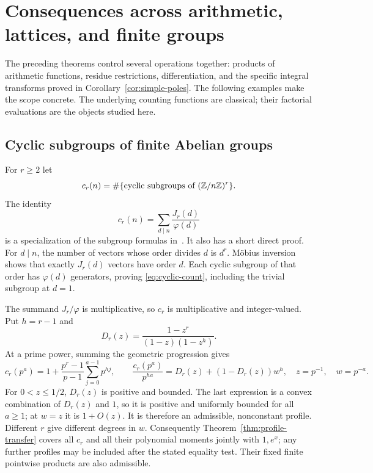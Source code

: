 \section{Consequences across arithmetic, lattices, and finite groups}
\label{sec:applications}

The preceding theorems control several operations together: products
of arithmetic functions, residue restrictions, differentiation, and
the specific integral transforms proved in
Corollary~\ref{cor:simple-poles}.  The following examples make the
scope concrete.  The underlying counting functions are classical;
their factorial evaluations are the objects studied here.

\subsection{Cyclic subgroups of finite Abelian groups}

For $r\geq2$ let
\[
 c_r(n)=\#\{\text{cyclic subgroups of }(\mathbb Z/n\mathbb Z)^r\}.
\]
The identity
\begin{equation}\label{eq:cyclic-count}
 c_r(n)=\sum_{d\mid n}\frac{J_r(d)}{\varphi(d)}
\end{equation}
is a specialization of the subgroup formulas in~\cite{Toth12}.
It also has a short direct proof.  For $d\mid n$, the number of
vectors whose order divides $d$ is $d^r$.  M\"obius inversion shows
that exactly $J_r(d)$ vectors have order $d$.  Each cyclic subgroup
of that order has $\varphi(d)$ generators, proving
\eqref{eq:cyclic-count}, including the trivial subgroup at $d=1$.

The summand $J_r/\varphi$ is multiplicative, so $c_r$ is
multiplicative and integer-valued.  Put $h=r-1$ and
\[
 D_r(z)=\frac{1-z^r}{(1-z)(1-z^h)}.
\]
At a prime power, summing the geometric progression gives
\[
 c_r(p^a)=1+\frac{p^r-1}{p-1}
                       \sum_{j=0}^{a-1}p^{hj},\qquad
 \frac{c_r(p^a)}{p^{ha}}
       =D_r(z)+(1-D_r(z))w^h,
 \quad z=p^{-1},\quad w=p^{-a}.
\]
For $0<z\leq1/2$, $D_r(z)$ is positive and bounded.  The last
expression is a convex combination of $D_r(z)$ and $1$, so it is
positive and uniformly bounded for all $a\geq1$; at $w=z$ it is
$1+O(z)$.  It is therefore an admissible, nonconstant profile.
Different $r$ give different degrees in $w$.  Consequently
Theorem~\ref{thm:profile-transfer} covers all $c_r$ and all their
polynomial moments jointly with $1,e^x$; any further profiles may
be included after the stated equality test.  Their fixed finite
pointwise products are also admissible.


